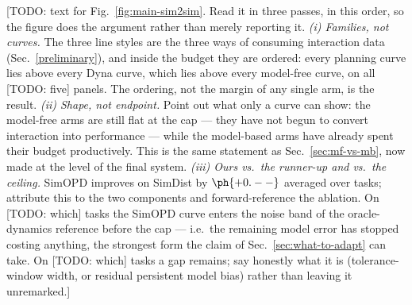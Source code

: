 [TODO: text for Fig.~\ref{fig:main-sim2sim}. Read it in three passes, in this
order, so the figure does the argument rather than merely reporting it.
\emph{(i) Families, not curves.} The three line styles are the three ways of
consuming interaction data (Sec.~\ref{preliminary}), and inside the budget they
are ordered: every planning curve lies above every Dyna curve, which lies above
every model-free curve, on all [TODO: five] panels. The ordering, not the margin
of any single arm, is the result.
\emph{(ii) Shape, not endpoint.} Point out what only a curve can show: the
model-free arms are still flat at the cap --- they have not begun to convert
interaction into performance --- while the model-based arms have already spent
their budget productively. This is the same statement as
Sec.~\ref{sec:mf-vs-mb}, now made at the level of the final system.
\emph{(iii) Ours vs.\ the runner-up and vs.\ the ceiling.} SimOPD improves on
SimDist by $\ph{+0.--}$ averaged over tasks; attribute this to the two
components and forward-reference the ablation. On [TODO: which] tasks the SimOPD
curve enters the noise band of the oracle-dynamics reference before the cap ---
i.e.\ the remaining model error has stopped costing anything, the strongest form
the claim of Sec.~\ref{sec:what-to-adapt} can take. On [TODO: which] tasks a gap
remains; say honestly what it is (tolerance-window width, or residual persistent
model bias) rather than leaving it unremarked.]

